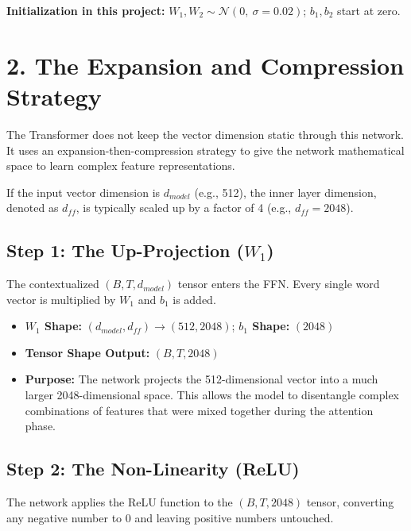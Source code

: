\documentclass[11pt,a4paper,oneside]{report}
\providecommand{\tightlist}{\setlength{\itemsep}{0pt}\setlength{\parskip}{0pt}}
\begin{document}
\textbf{Initialization in this project:} \(W_1, W_2 \sim \mathcal{N}(0,\ \sigma = 0.02)\); \(b_1, b_2\) start at zero.

\section{2. The Expansion and Compression Strategy}\label{2-the-expansion-and-compression-strategy}

The Transformer does not keep the vector dimension static through this network. It uses an expansion-then-compression strategy to give the network mathematical space to learn complex feature representations.

If the input vector dimension is \(d_{model}\) (e.g., 512), the inner layer dimension, denoted as \(d_{ff}\), is typically scaled up by a factor of 4 (e.g., \(d_{ff} = 2048\)).

\subsection{\texorpdfstring{Step 1: The Up-Projection (\(W_1\))}{Step 1: The Up-Projection (W\_1)}}\label{step-1-the-up-projection-w_1}

The contextualized \((B, T, d_{model})\) tensor enters the FFN. Every single word vector is multiplied by \(W_1\) and \(b_1\) is added.

\begin{itemize}
\tightlist
\item
  \textbf{\(W_1\) Shape:} \((d_{model}, d_{ff}) \rightarrow (512, 2048)\); \textbf{\(b_1\) Shape:} \((2048)\)
\item
  \textbf{Tensor Shape Output:} \((B, T, 2048)\)
\item
  \textbf{Purpose:} The network projects the 512-dimensional vector into a much larger 2048-dimensional space. This allows the model to disentangle complex combinations of features that were mixed together during the attention phase.
\end{itemize}

\subsection{Step 2: The Non-Linearity (ReLU)}\label{step-2-the-non-linearity-relu}

The network applies the ReLU function to the \((B, T, 2048)\) tensor, converting any negative number to \(0\) and leaving positive numbers untouched.
\end{document}
